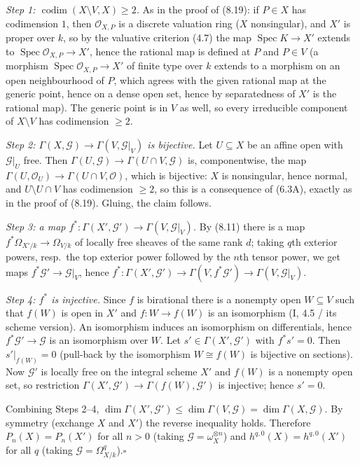 \documentclass[11pt]{article}
\begin{document}
\emph{Step 1: $\operatorname{codim}(X\setminus V,X)\ge2$.} As in the proof of (8.19): if $P\in X$ has codimension $1$, then $\mathcal O_{X,P}$ is a discrete valuation ring ($X$ nonsingular), and $X'$ is proper over $k$, so by the valuative criterion (4.7) the map $\operatorname{Spec}K\to X'$ extends to $\operatorname{Spec}\mathcal O_{X,P}\to X'$, hence the rational map is defined at $P$ and $P\in V$ (a morphism $\operatorname{Spec}\mathcal O_{X,P}\to X'$ of finite type over $k$ extends to a morphism on an open neighbourhood of $P$, which agrees with the given rational map at the generic point, hence on a dense open set, hence by separatedness of $X'$ is the rational map). The generic point is in $V$ as well, so every irreducible component of $X\setminus V$ has codimension $\ge2$.

\emph{Step 2: $\Gamma(X,\mathcal G)\to\Gamma(V,\mathcal G|_V)$ is bijective.} Let $U\subseteq X$ be an affine open with $\mathcal G|_U$ free. Then $\Gamma(U,\mathcal G)\to\Gamma(U\cap V,\mathcal G)$ is, componentwise, the map $\Gamma(U,\mathcal O_U)\to\Gamma(U\cap V,\mathcal O)$, which is bijective: $X$ is nonsingular, hence normal, and $U\setminus U\cap V$ has codimension $\ge2$, so this is a consequence of (6.3A), exactly as in the proof of (8.19). Gluing, the claim follows.

\emph{Step 3: a map $f^*:\Gamma(X',\mathcal G')\to\Gamma(V,\mathcal G|_V)$.} By (8.11) there is a map $f^*\Omega_{X'/k}\to\Omega_{V/k}$ of locally free sheaves of the same rank $d$; taking $q$th exterior powers, resp.\ the top exterior power followed by the $n$th tensor power, we get maps $f^*\mathcal G'\to\mathcal G|_V$, hence $f^*:\Gamma(X',\mathcal G')\to\Gamma(V,f^*\mathcal G')\to\Gamma(V,\mathcal G|_V)$.

\emph{Step 4: $f^*$ is injective.} Since $f$ is birational there is a nonempty open $W\subseteq V$ such that $f(W)$ is open in $X'$ and $f:W\to f(W)$ is an isomorphism (I, 4.5 / its scheme version). An isomorphism induces an isomorphism on differentials, hence $f^*\mathcal G'\to\mathcal G$ is an isomorphism over $W$. Let $s'\in\Gamma(X',\mathcal G')$ with $f^*s'=0$. Then $s'|_{f(W)}=0$ (pull-back by the isomorphism $W\cong f(W)$ is bijective on sections). Now $\mathcal G'$ is locally free on the integral scheme $X'$ and $f(W)$ is a nonempty open set, so restriction $\Gamma(X',\mathcal G')\to\Gamma(f(W),\mathcal G')$ is injective; hence $s'=0$.

Combining Steps 2--4, $\dim\Gamma(X',\mathcal G')\le\dim\Gamma(V,\mathcal G)=\dim\Gamma(X,\mathcal G)$. By symmetry (exchange $X$ and $X'$) the reverse inequality holds. Therefore $P_n(X)=P_n(X')$ for all $n>0$ (taking $\mathcal G=\omega_X^{\otimes n}$) and $h^{q,0}(X)=h^{q,0}(X')$ for all $q$ (taking $\mathcal G=\Omega^q_{X/k}$).\hfill$\square$
\end{document}
